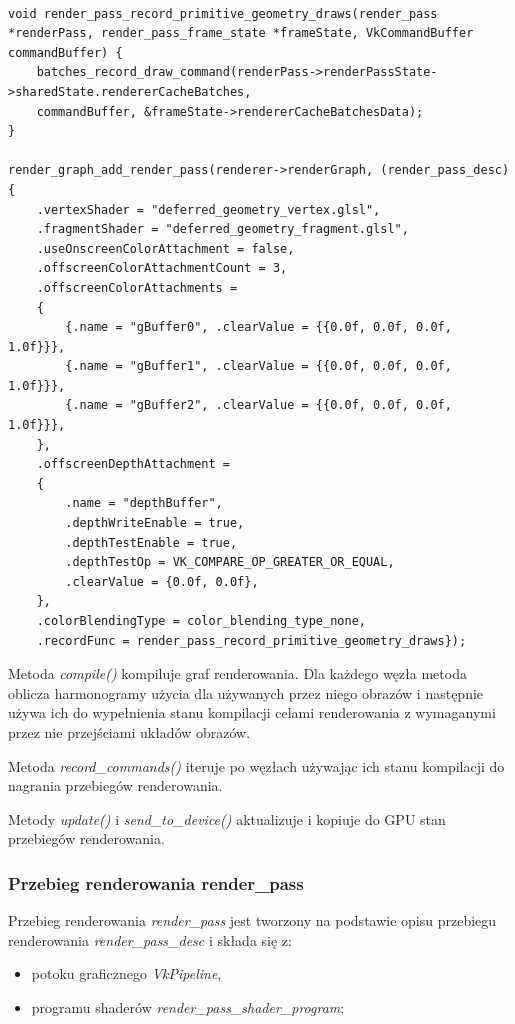 \begin{lstlisting}[caption={Dodawanie przebiegu geometrii do grafu renderowania przykładowej aplikacji},captionpos=b,label={render_graph_deferred_geometry}]

void render_pass_record_primitive_geometry_draws(render_pass *renderPass, render_pass_frame_state *frameState, VkCommandBuffer commandBuffer) {
	batches_record_draw_command(renderPass->renderPassState->sharedState.rendererCacheBatches,
	commandBuffer, &frameState->rendererCacheBatchesData);
}

render_graph_add_render_pass(renderer->renderGraph, (render_pass_desc){
	.vertexShader = "deferred_geometry_vertex.glsl",
	.fragmentShader = "deferred_geometry_fragment.glsl",
	.useOnscreenColorAttachment = false,
	.offscreenColorAttachmentCount = 3,
	.offscreenColorAttachments =
	{
		{.name = "gBuffer0", .clearValue = {{0.0f, 0.0f, 0.0f, 1.0f}}},
		{.name = "gBuffer1", .clearValue = {{0.0f, 0.0f, 0.0f, 1.0f}}},
		{.name = "gBuffer2", .clearValue = {{0.0f, 0.0f, 0.0f, 1.0f}}},
	},
	.offscreenDepthAttachment =
	{
		.name = "depthBuffer",
		.depthWriteEnable = true,
		.depthTestEnable = true,
		.depthTestOp = VK_COMPARE_OP_GREATER_OR_EQUAL,
		.clearValue = {0.0f, 0.0f},
	},
	.colorBlendingType = color_blending_type_none,
	.recordFunc = render_pass_record_primitive_geometry_draws});
\end{lstlisting}

Metoda \textit{compile()} kompiluje graf renderowania.
Dla każdego węzła metoda oblicza harmonogramy użycia dla używanych przez niego obrazów i następnie używa ich do wypełnienia stanu kompilacji celami renderowania z wymaganymi przez nie przejściami układów obrazów.

Metoda \textit{record\_commands()} iteruje po węzłach używając ich stanu kompilacji do nagrania przebiegów renderowania.

Metody \textit{update()} i \textit{send\_to\_device()} aktualizuje i kopiuje do GPU stan przebiegów renderowania.


\subsubsection{Przebieg renderowania render\_pass}
Przebieg renderowania \textit{render\_pass} jest tworzony na podstawie opisu przebiegu renderowania \textit{render\_pass\_desc} i składa się z:
\begin{itemize}
	\item potoku graficznego \textit{VkPipeline},
	\item programu shaderów \textit{render\_pass\_shader\_program};
\end{itemize}

